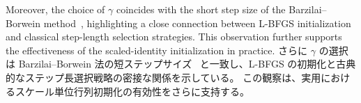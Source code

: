 \documentclass[0_main]{subfiles}
\begin{document}
\ifEn
    Moreover, the choice of $\gamma$ coincides with the short step size of the Barzilai--Borwein method~\citep{barzilaiTwoPointStepSize1988}, highlighting a close connection between L-BFGS initialization and classical step-length selection strategies.
    This observation further supports the effectiveness of the scaled-identity initialization in practice.
\else
    さらに $\gamma$ の選択は Barzilai--Borwein 法の短ステップサイズ~\citep{barzilaiTwoPointStepSize1988} と一致し、L-BFGS の初期化と古典的なステップ長選択戦略の密接な関係を示している。
    この観察は、実用におけるスケール単位行列初期化の有効性をさらに支持する。
\fi

\ifSubfilesClassLoaded{
    
    
}{}
\end{document}
